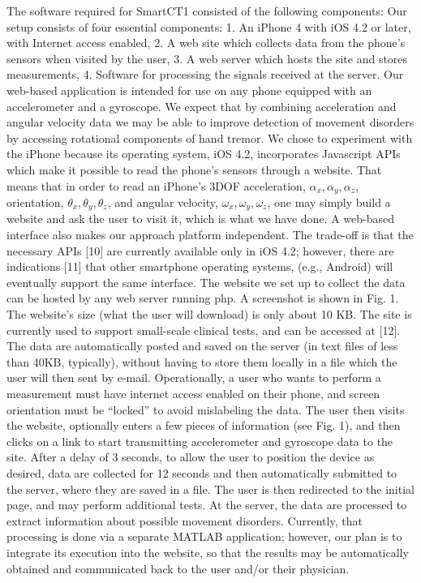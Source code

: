 The software required for \gls{SmartCT1} consisted of the following components:
Our setup consists of four essential components:
1. An iPhone 4 with iOS 4.2 or later, with Internet access enabled,
2. A web site which collects data from the phone’s sensors when visited by the user,
3. A web server which  hosts the site and stores measurements,
4. Software for processing the signals received at the server.
Our web-based application is intended for use on any phone equipped with an accelerometer and a gyroscope. We expect that by combining acceleration and angular velocity data we may be able to improve detection of movement disorders by accessing rotational components of hand tremor. We chose to experiment with the iPhone because its operating system, iOS 4.2, incorporates Javascript APIs which make it possible to read the phone’s sensors through a website. That means that in order to read an iPhone’s 3DOF acceleration, $\alpha_{x},\alpha_{y},\alpha_{z}$, orientation, $\theta_{x},\theta_{y},\theta_{z}$,  and angular velocity, $\omega_{x},\omega_{y},\omega_{z}$,  one may simply build a website and ask the user to visit it, which is what we have done.
A web-based interface also makes our approach platform independent. The trade-off is that the necessary APIs [10] are currently available only in iOS 4.2; however, there are indications [11] that other smartphone operating systems, (e.g., Android) will eventually support the same interface.
The website we set up to collect the data can be hosted by any web server running php. A screenshot is shown in Fig. 1. The website’s size (what the user will download) is only about 10 KB. The site is currently used to support small-scale clinical tests, and can be accessed at [12]. The data are automatically posted and saved on the server (in text files of less than 40KB, typically), without having to store them locally in a file which the user will then sent by e-mail. 
Operationally, a user who wants to perform a measurement must have internet access enabled on their phone, and screen orientation must be “locked” to avoid mislabeling the data. The user then visits the website, optionally enters a few pieces of information (see Fig. 1), and then clicks on a link to start transmitting accelerometer and gyroscope data to the site. After a delay of 3 seconds, to allow the user to position the device as desired, data are collected for 12 seconds and then automatically submitted to the server, where they are saved in a file. The user is then redirected to the initial page, and may perform additional tests. At the server, the data are processed to extract information about possible movement disorders. Currently, that processing is done via a separate MATLAB application; however, our plan is to integrate its execution into the website, so that the results may be automatically obtained and communicated back to the user and/or their physician.  


